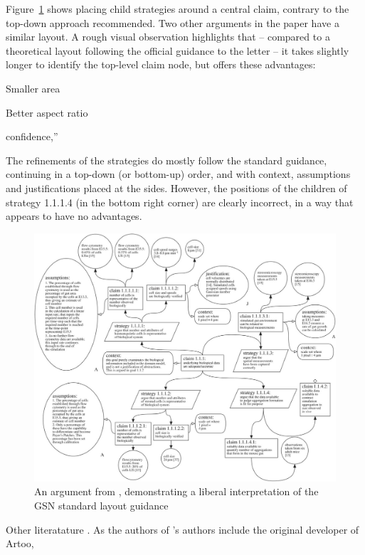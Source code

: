Figure~\ref{fig:aldencentral} shows \citet{royal} placing child strategies around a central claim, contrary to the top-down approach recommended. Two other arguments in the paper \cite[pp.~8--9]{royal} have a similar layout.
A rough visual observation highlights that -- compared to a theoretical layout following the official guidance to the letter -- it takes slightly longer to identify the top-level claim node, but offers these advantages:

\begin{itemize*}
\item Smaller area
\item Better aspect ratio
\item 
\end{itemize*}confidence,”

The refinements of the strategies do mostly follow the standard guidance, continuing in a top-down (or bottom-up) order, and with context, assumptions and justifications placed at the sides. However, the positions of the children of strategy 1.1.1.4 (in the bottom right corner) are clearly incorrect, in a way that appears to have no advantages.

\begin{figure}
    \includegraphics[width=\textwidth]{graphics/aldencentral.jpg}
    \caption{An argument from \cite{royal}, demonstrating a liberal interpretation of the GSN standard layout guidance}
    \label{fig:aldencentral}
\end{figure}

Other literatature  . As the authors of \cite{royal}'s authors include the original developer of Artoo, 

